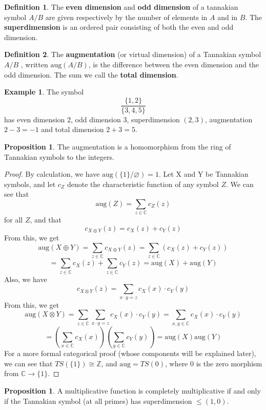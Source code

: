 \documentclass[a4paper]{article}
\theoremstyle{definition}
\newtheorem{definition}{Definition}[section]
\newtheorem{example}{Example}[section]
\newtheorem{proposition}[theorem]{Proposition}
\theoremstyle{remark}
\newcommand{\tdim}{\mathrm{tdim}}
\newcommand{\vdim}{\mathrm{vdim}}
\newcommand{\edim}{\mathrm{edim}}
\newcommand{\odim}{\mathrm{odim}}
\newcommand{\aug}{\mathrm{aug}}
\newcommand{\sdim}{\mathrm{sdim}}
\newcommand{\Z}{\mathbb{Z}}
\newcommand{\C}{\mathbb{C}}
\newcommand{\defhl}[1]{\textbf{#1}}
\begin{document}
\begin{definition}
The \defhl{even dimension} and \defhl{odd dimension} of a tannakian symbol $A/B$ are given respectively by the number of elements in $A$ and in $B$. The \defhl{superdimension} is an ordered pair consisting of both the even and odd dimension.
\end{definition}%

\begin{definition}
The \defhl{augmentation} (or virtual dimension) of a Tannakian symbol $A/B$ , written $\aug(A/B)$, is the difference between the even dimension and the odd dimension. The sum we call the \defhl{total dimension}.
\end{definition}

\begin{example}
The symbol $$\frac{\{1,2\}}{\{3,4,5\}}$$ has even dimension $2$, odd dimension $3$, superdimension $(2, 3)$, augmentation $2 - 3 = -1$ and total dimension $2 + 3 = 5$.
\end{example}

\begin{proposition}
The augmentation is a homomorphism from the ring of Tannakian symbols to the integers.
\end{proposition}

\begin{proof}
By calculation, we have $\aug(\{1\}/\varnothing) = 1$. Let X and Y be Tannakian symbols, and let $c_Z$ denote the characteristic function of any symbol $Z$. We can see that 
$$\aug(Z) = \sum_{z \in \C} c_Z(z)$$
for all $Z$, and that 
$$c_{X \oplus Y}(z) = c_X(z) + c_Y(z)$$
From this, we get
$$\aug(X \oplus Y) = \sum_{z \in \C} c_{X \oplus Y}(z) = \sum_{z \in \C} (c_X(z) + c_Y(z)) $$
$$ = \sum_{z \in \C} c_X(z) + \sum_{z \in \C} c_Y(z) = \aug(X) + \aug(Y)$$
Also, we have 
$$c_{X \otimes Y}(z) = \sum_{x \cdot y=z} c_X(x) \cdot c_Y(y)$$
From this, we get
$$\aug(X \otimes Y) = \sum_{z \in \C} \sum_{x \cdot y=z}c_X(x) \cdot c_Y(y) = \sum_{x, y \in \C} c_X(x) \cdot c_Y(y) $$
$$=\left(\sum_{x \in \C} c_X(x)\right)\left(\sum_{y \in \C} c_Y(y)\right) = \aug(X)\aug(Y)$$
For a more formal categorical proof (whose components will be explained later), we can see that $TS(\{1\}) \cong \Z$, and $\aug = TS(0)$, where $0$ is the zero morphism from $\C \to \{1\}$.
\end{proof}

\begin{proposition}\label{compmultstructure}
A multiplicative function is completely multiplicative if and only if the Tannakian symbol (at all primes) has superdimension $\le (1, 0)$.
\end{proposition}
\end{document}
